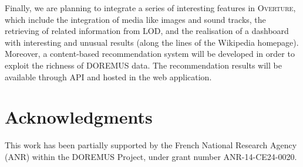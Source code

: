 Finally, we are planning to integrate a series of interesting features in \textsc{Overture}, which include the integration of media like images and sound tracks, the retrieving of related information from LOD, and the realisation of a dashboard with interesting and unusual results (along the lines of the Wikipedia homepage). Moreover, a content-based recommendation system will be developed in order to exploit the richness of DOREMUS data. The recommendation results will be available through API and hosted in the web application.


\section{Acknowledgments}
This work has been partially supported by the French National Research Agency (ANR) within the DOREMUS Project, under grant number ANR-14-CE24-0020.